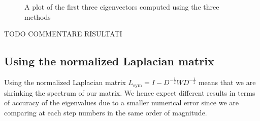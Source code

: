 \begin{figure}[H]
    \caption{A plot of the first three eigenvectors computed using the three methods}
    \label{Eigenvectors_comp}
\end{figure}

TODO COMMENTARE RISULTATI

\subsection*{Using the normalized Laplacian matrix}
Using the normalized Laplacian matrix \(L_{\text{sym}} = I - D^{-\frac{1}{2}}WD^{-\frac{1}{2}}\) means that we are shrinking the spectrum of our matrix. We hence expect different results in terms of accuracy of the eigenvalues due to a smaller numerical error since we are comparing at each step numbers in the same order of magnitude.

